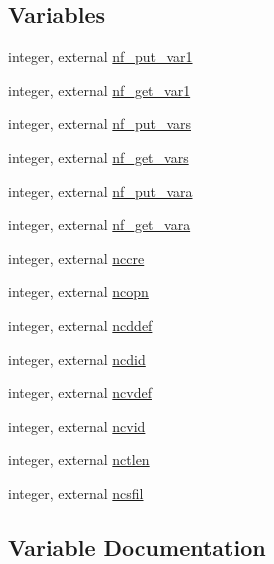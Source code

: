 \subsection*{Variables}
\begin{DoxyCompactItemize}
\item 
integer, external \hyperlink{namespacenetcdf__nf__interfaces_ab28586e215ff7b47a47824f092ad6c3d}{nf\+\_\+put\+\_\+var1}
\item 
integer, external \hyperlink{namespacenetcdf__nf__interfaces_ac7bad2f6b2652e7e1266d61f7bdc8849}{nf\+\_\+get\+\_\+var1}
\item 
integer, external \hyperlink{namespacenetcdf__nf__interfaces_a6a8028b7b7144de9fe3c5483ada5215f}{nf\+\_\+put\+\_\+vars}
\item 
integer, external \hyperlink{namespacenetcdf__nf__interfaces_a3016653fa1548d2ae9558f39ca38d2e9}{nf\+\_\+get\+\_\+vars}
\item 
integer, external \hyperlink{namespacenetcdf__nf__interfaces_af7ac5b8300295c6a9909239706b931be}{nf\+\_\+put\+\_\+vara}
\item 
integer, external \hyperlink{namespacenetcdf__nf__interfaces_a436c7c2250cddd5fa23233b7c3e2ba14}{nf\+\_\+get\+\_\+vara}
\item 
integer, external \hyperlink{namespacenetcdf__nf__interfaces_a0a013492417b1babe89a2dbdb8eca4b8}{nccre}
\item 
integer, external \hyperlink{namespacenetcdf__nf__interfaces_a057b10a968928383fda154c197079de3}{ncopn}
\item 
integer, external \hyperlink{namespacenetcdf__nf__interfaces_a8a4ac4b41a06eaccfd346a131fd414ec}{ncddef}
\item 
integer, external \hyperlink{namespacenetcdf__nf__interfaces_a750d36a44917a843c7d3b7d6d913cc46}{ncdid}
\item 
integer, external \hyperlink{namespacenetcdf__nf__interfaces_afe0da902f495271e711f147b4128e17e}{ncvdef}
\item 
integer, external \hyperlink{namespacenetcdf__nf__interfaces_a2adb0118a059b178c9927447ed736a8d}{ncvid}
\item 
integer, external \hyperlink{namespacenetcdf__nf__interfaces_a4e214b358ce1001955e4a9b538eec4ed}{nctlen}
\item 
integer, external \hyperlink{namespacenetcdf__nf__interfaces_a80f7509a41906746b45260d8ac63ec2b}{ncsfil}
\end{DoxyCompactItemize}


\subsection{Variable Documentation}
\mbox{\label{namespacenetcdf__nf__interfaces_a0a013492417b1babe89a2dbdb8eca4b8}} 
